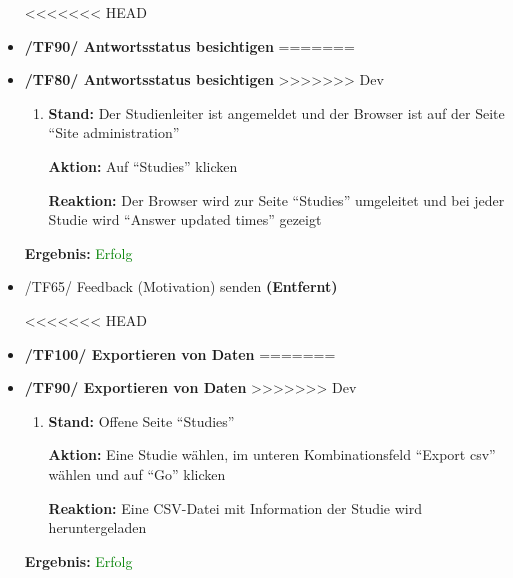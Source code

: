 \documentclass[a4paper]{scrreprt}
\begin{document}
\begin{itemize}
		
<<<<<<< HEAD
		                      \item \textbf{/TF90/ Antwortsstatus besichtigen}
=======
		                      \item \textbf{/TF80/ Antwortsstatus besichtigen}
>>>>>>> Dev
		                          \begin{enumerate}
		                              \item \par \textbf{Stand: } Der Studienleiter ist angemeldet und der Browser ist auf der Seite ``Site administration''
		                                    \par \textbf{Aktion: }Auf ``Studies'' klicken
		                                    \par \textbf{Reaktion: }Der Browser wird zur Seite ``Studies'' umgeleitet und bei jeder Studie wird ``Answer updated times'' gezeigt
		                          \end{enumerate}		
		      					\vspace*{0.3cm}
		      		           \par \textbf{Ergebnis: }\textcolor{green}{Erfolg}
		      		           \vspace*{0.6cm} 	
		      		
		      				\item /TF65/ Feedback (Motivation) senden \textbf{(Entfernt)}	
		      				\vspace*{0.6cm}	
		      				
<<<<<<< HEAD
		                      \item \textbf{/TF100/ Exportieren von Daten}
=======
		                      \item \textbf{/TF90/ Exportieren von Daten}
>>>>>>> Dev
		                      \begin{enumerate}
		                          \item \par \textbf{Stand: }Offene Seite ``Studies''
		                                \par \textbf{Aktion: }Eine Studie w\"ahlen, im unteren Kombinationsfeld ``Export csv'' w\"ahlen und auf ``Go'' klicken
		                                \par \textbf{Reaktion: }Eine CSV-Datei mit Information der Studie wird heruntergeladen
		                      \end{enumerate}	
		      					\vspace*{0.3cm}
		      		           \par \textbf{Ergebnis: }\textcolor{green}{Erfolg}
		      		           \vspace*{0.6cm}                 			
		      		
		      		           \end{itemize}
	
\end{document}
